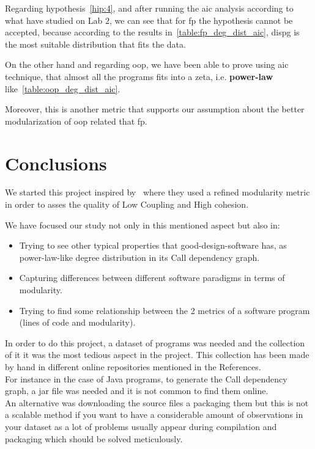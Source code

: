 \documentclass[12pt, a4paper]{article}
\begin{document}
Regarding hypothesis~\ref{hip:4}, and after running the \acrlong{aic} analysis according to what have studied on Lab $2$, we can see that for \acrlong{fp} the hypothesis cannot be accepted,
because according to the results in~\ref{table:fp_deg_dist_aic}, \acrlong{dispg} is the most suitable distribution that fits the data.

On the other hand and regarding \acrlong{oop}, we have been able to prove using \acrlong{aic} technique, that almost all the programs fits into a \acrlong{zeta}, i.e. \textbf{power-law} like~\ref{table:oop_deg_dist_aic}.

Moreover, this is another metric that supports our assumption about the better modularization of \acrlong{oop} related that \acrlong{fp}.

\section{Conclusions}

We started this project inspired by~\cite{cohesion_coupling} where they used a refined modularity metric in order to asses the quality of Low Coupling and High cohesion.

We have focused our study not only in this mentioned aspect but also in:

\begin{itemize}
  \item Trying to see other typical properties that good-design-software has, as power-law-like degree distribution in its Call dependency graph.
  \item Capturing differences between different software paradigms in terms of modularity.
  \item Trying to find some relationship between the 2 metrics of a software program (lines of code and modularity).
\end{itemize}

In order to do this project, a dataset of programs was needed and the collection of it it was the most tedious aspect in the project. This collection has been made by hand in different online repositories mentioned in the References. \\
For instance in the case of Java programs, to generate the Call dependency graph, a jar file was needed and it is not common to find them online.\\ An alternative was downloading the source files a packaging them but this is not a scalable method if you want to have a considerable amount of observations in your dataset as a lot of problems usually appear during compilation and packaging which should be solved meticulously. 
\end{document}
